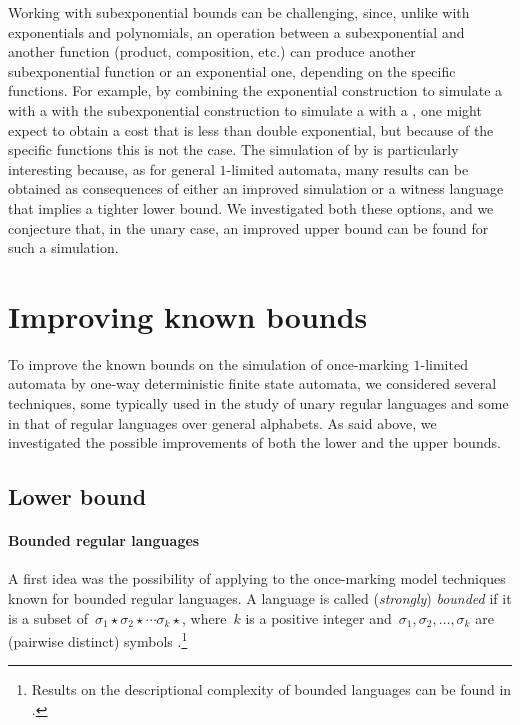 Working with subexponential bounds can be challenging, since, unlike with exponentials and polynomials, an operation between a subexponential and another function (product, composition, etc.) can produce another subexponential function or an exponential one, depending on the specific functions.
For example, by combining the exponential construction to simulate a \OLA with a \ONFA with the subexponential construction to simulate a \ONFA with a \ODFA, one might expect to obtain a cost that is less than double exponential, but because of the specific functions this is not the case.
The simulation of \OMOLAs by \ODFAs is particularly interesting because, as for general $1$-limited automata, many results can be obtained as consequences of either an improved simulation or a witness language that implies a tighter lower bound.
We investigated both these options, and we conjecture that, in the unary case, an improved upper bound can be found for such a simulation.



\section{Improving known bounds}\label{sec:oncemarking-ideas}
To improve the known bounds on the simulation of once-marking $1$-limited automata by one-way deterministic finite state automata, we considered several techniques, some typically used in the study of unary regular languages and some in that of regular languages over general alphabets.
As said above, we investigated the possible improvements of both the lower and the upper bounds.


\subsection{Lower bound}

\paragraph{Bounded regular languages} A first idea was the possibility of applying to the once-marking model techniques known for bounded regular languages.
A language is called (\emph{strongly}) \emph{bounded} if it is a subset of~$\sigma_1\star\sigma_2\star\cdots\sigma_k\star$, where~$k$ is a positive integer and~$\sigma_1,\sigma_2,\dots,\sigma_k$ are (pairwise distinct) symbols \cite{GinSpa66}.\footnote{%
	Results on the descriptional complexity of bounded languages can be found in \cite{Gin66,MalPig13,IbaRav16,HerKut+17}.}

